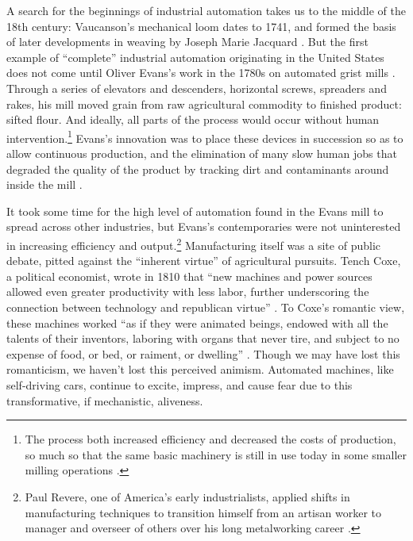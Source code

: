 A search for the beginnings of industrial automation takes us to the middle of
the 18th century: Vaucanson's mechanical loom dates to 1741, and formed the basis of
 later developments in weaving by Joseph Marie Jacquard \cite[p. 9]{dieboldImpact}. 
But the first example of ``complete'' industrial automation originating in the
United States does not come until Oliver Evans's work in the 1780s on
automated grist mills \cite[p. 5]{roesmithYankee}. Through a series of elevators and descenders,
horizontal screws, spreaders and rakes, his mill moved grain from raw
agricultural commodity to finished product: sifted flour. And ideally,
all parts of the process would occur without human
intervention.\footnote{The process both increased efficiency and
  decreased the costs 
of production, so much so that the same basic machinery is still in
use today in some smaller milling operations \cite{wyegrist}.}
Evans's innovation was to place these devices 
in succession so as to allow continuous production, and the
elimination of many slow human jobs that degraded the quality of the
product by tracking dirt and contaminants around inside the
mill \cite[p. 203]{evansMillguide}. 


It took some time for the high level of automation found in the Evans
mill to spread across other industries, but Evans's contemporaries
were not uninterested in increasing efficiency and output.\footnote{Paul
Revere, one of America's early industrialists, applied shifts in
manufacturing techniques to transition himself from an
artisan worker to manager and overseer of others over his long
metalworking career \cite[p. 187]{martello}.} Manufacturing itself was a site of public
debate, pitted against the ``inherent virtue'' of agricultural pursuits.
Tench Coxe, a political economist, wrote in 1810 that ``new machines
and power sources allowed even greater productivity with less labor,
further underscoring the connection between technology and republican
virtue'' \cite[p. 217]{martello}. To Coxe's romantic view, these machines  worked ``as if they
were animated beings, endowed with all the talents of their inventors,
laboring with organs that never tire, and subject to no expense of
food, or bed, or raiment, or dwelling'' \cite[p. xxv]{coxe}. Though we
may have lost this romanticism, we haven't lost this perceived
animism. Automated machines, like self-driving cars, continue to
excite, impress, and cause fear due to this transformative, if
mechanistic, aliveness.

